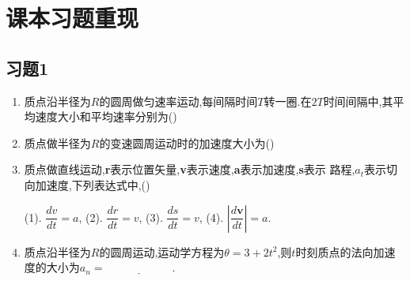 \section{课本习题重现}
\subsection{习题1}


\begin{enumerate}

\item[\textbf{1-4}] 质点沿半径为$R$的圆周做匀速率运动,每间隔时间$T$转一圈.在$2T$时间间隔中,其平均速度大小和平均速率分别为(\quad)



\item[\textbf{1-5}] 质点做半径为$R$的变速圆周运动时的加速度大小为(\quad)


\item[\textbf{1-7}] 质点做直线运动,\textbf{r}表示位置矢量,\textbf{v}表示速度,\textbf{a}表示加速度,\textbf{s}表示 路程,$a_t$表示切向加速度,下列表达式中,(\quad)

(1). $\dfrac{dv}{dt} = a$,
(2). $\dfrac{{dr}}{dt} = {v}$,
(3). $\dfrac{ds}{dt} = v$,
(4). $\left| \dfrac{d\mathbf{v}}{dt} \right| = a$.


\item[\textbf{1-12}] 质点沿半径为$R$的圆周运动,运动学方程为$\theta  = 3 + 2t^2$,则$t$时刻质点的法向加速度的大小为$a_n = \underline{\hspace{6em}}.$



\end{enumerate}
